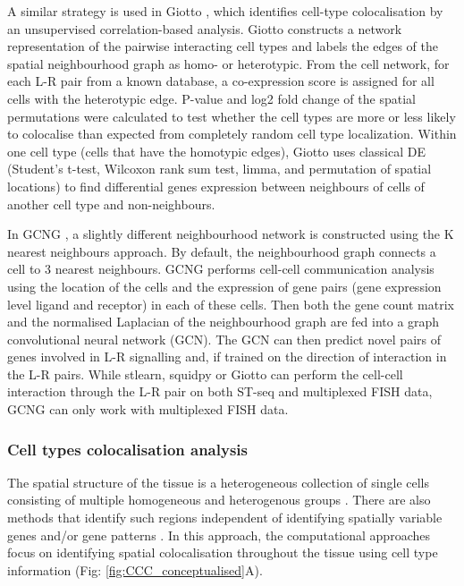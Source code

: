 A similar strategy is used in Giotto \cite{dries2021giotto}, which identifies cell-type colocalisation by an unsupervised correlation-based analysis. Giotto constructs a network representation of the pairwise interacting cell types and labels the edges of the spatial neighbourhood graph as homo- or heterotypic. From the cell network, for each L-R pair from a known database, a co-expression score is assigned for all cells with the heterotypic edge. P-value and log2 fold change of the spatial permutations were calculated to test whether the cell types are more or less likely to colocalise than expected from completely random cell type localization. Within one cell type (cells that have the homotypic edges), Giotto uses classical DE (Student’s t-test, Wilcoxon rank sum test, limma, and permutation of spatial locations) to find differential genes expression between neighbours of cells of another cell type and non-neighbours.

In GCNG \cite{yuan2020gcng}, a slightly different neighbourhood network is constructed using the K nearest neighbours approach. By default, the neighbourhood graph connects a cell to 3 nearest neighbours. GCNG performs cell-cell communication analysis using the location of the cells and the expression of gene pairs (gene expression level ligand and receptor) in each of these cells. Then both the gene count matrix and the normalised Laplacian of the neighbourhood graph are fed into a graph convolutional neural network (GCN). The GCN can then predict novel pairs of genes involved in L-R signalling and, if trained on the direction of interaction in the L-R pairs. While stlearn, squidpy or Giotto can perform the cell-cell interaction through the L-R pair on both ST-seq and multiplexed FISH data, GCNG can only work with multiplexed FISH data. 

\subsubsection{Cell types colocalisation analysis}
The spatial structure of the tissue is a heterogeneous collection of single cells consisting of multiple homogeneous and heterogenous groups \cite{schurch2020coordinated}. There are also methods that identify such regions independent of identifying spatially variable genes and/or gene patterns \cite{moses2022museum}. In this approach, the computational approaches focus on identifying spatial colocalisation throughout the tissue using cell type information (Fig: \ref{fig:CCC_conceptualised}A). 

